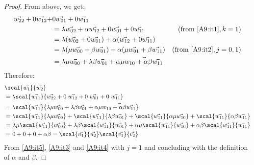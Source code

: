\begin{lemma}
\begin{proof}
    From above, we get:
    \begin{align*}
        \vec{w_{22}} + 0\vec{w_{12}} + &0\vec{w_{01}} + 0\vec{w_{11}} \\
        &= \lambda\vec{w_{02}} + \alpha\vec{w_{12}} + 0\vec{w_{01}} + 0\vec{w_{11}} & (\text{from \ref{A9:it1}}, k =1)\\
        &= \lambda(\vec{w_{02}}+0\vec{w_{01}}) + \alpha(\vec{w_{12}}+0\vec{w_{11}})&\\
        &= \lambda(\mu\vec{w_{00}} + \beta\vec{w_{01}}) + \alpha(\mu\vec{w_{01}}+\beta\vec{w_{11}}) & (\text{from \ref{A9:it2}}, j=0,1)\\
        &= \lambda\mu\vec{w_{00}} + \lambda\beta\vec{w_{01}} + \alpha\mu\vec{w_{10} + \alpha\beta\vec{w_{11}}}
    \end{align*}
    Therefore:
    \begin{align*}
        &\scal{\vec{w_1}}{\vec{w_2}} \\
        &= \scal{\vec{w_{11}}}{\vec{w_{22}} + 0\;\vec{w_{12}} + 0\;\vec{w_{01}} + 0\;\vec{w_{11}}}\\
        &= \scal{\vec{w_{11}}}{\lambda\mu\vec{w_{00}} + \lambda\beta\vec{w_{01}} + \alpha\mu\vec{w_{10} + \alpha\beta\vec{w_{11}}}}\\
        &=\scal{\vec{w_{11}}}{\lambda\mu\vec{w_{00}}} + \scal{\vec{w_{11}}}{\lambda\beta\vec{w_{01}}} + \scal{\vec{w_{11}}}{\alpha\mu\vec{w_{10}}} + \scal{\vec{w_{11}}}{\alpha\beta\vec{w_{11}}}\\
        &=\lambda\mu\scal{\vec{w_{11}}}{\vec{w_{00}}} + \lambda\beta\scal{\vec{w_{11}}}{\vec{w_{01}}} + \alpha\mu\scal{\vec{w_{11}}}{\vec{w_{10}}} + \alpha\beta\scal{\vec{w_{11}}}{\vec{w_{11}}}\\
        &= 0 + 0 + 0 + \alpha\beta = \scal{\vec{u_1}}{\vec{u_2}}\scal{\vec{v_1}}{\vec{v_2}}
    \end{align*}
    From \ref{A9:it5}, \ref{A9:it3} and \ref{A9:it4} with $j=1$ and concluding with the definition of $\alpha$ and $\beta$.
\end{proof}
\end{lemma}
